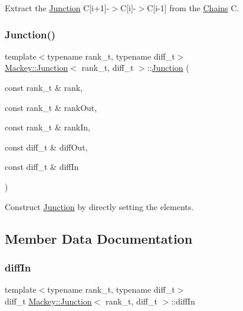 Extract the \hyperlink{classMackey_1_1Junction}{Junction} C\mbox{[}i+1\mbox{]}-\/$>$C\mbox{[}i\mbox{]}-\/$>$C\mbox{[}i-\/1\mbox{]} from the \hyperlink{classMackey_1_1Chains}{Chains} C. 

\mbox{\label{classMackey_1_1Junction_a62c85d26100ca5e561b3c9edf32b473f}} 
\subsubsection{\texorpdfstring{Junction()}{Junction()}\hspace{0.1cm}{\footnotesize\ttfamily [3/3]}}
{\footnotesize\ttfamily template$<$typename rank\+\_\+t, typename diff\+\_\+t$>$ \\
\hyperlink{classMackey_1_1Junction}{Mackey\+::\+Junction}$<$ rank\+\_\+t, diff\+\_\+t $>$\+::\hyperlink{classMackey_1_1Junction}{Junction} (\begin{DoxyParamCaption}\item[{const rank\+\_\+t \&}]{rank,  }\item[{const rank\+\_\+t \&}]{rank\+Out,  }\item[{const rank\+\_\+t \&}]{rank\+In,  }\item[{const diff\+\_\+t \&}]{diff\+Out,  }\item[{const diff\+\_\+t \&}]{diff\+In }\end{DoxyParamCaption})\hspace{0.3cm}{\ttfamily [inline]}}



Construct \hyperlink{classMackey_1_1Junction}{Junction} by directly setting the elements. 



\subsection{Member Data Documentation}
\mbox{\label{classMackey_1_1Junction_a581e0d7b62b7bf380d68936a79828cfc}} 
\subsubsection{\texorpdfstring{diff\+In}{diffIn}}
{\footnotesize\ttfamily template$<$typename rank\+\_\+t, typename diff\+\_\+t$>$ \\
diff\+\_\+t \hyperlink{classMackey_1_1Junction}{Mackey\+::\+Junction}$<$ rank\+\_\+t, diff\+\_\+t $>$\+::diff\+In}



